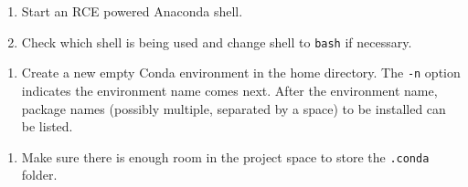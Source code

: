 \documentclass[]{book}
\newenvironment{Shaded}{\begin{snugshade}}{\end{snugshade}}
\newcommand{\DecValTok}[1]{\textcolor[rgb]{0.00,0.00,0.81}{#1}}
\newcommand{\StringTok}[1]{\textcolor[rgb]{0.31,0.60,0.02}{#1}}
\newcommand{\CommentTok}[1]{\textcolor[rgb]{0.56,0.35,0.01}{\textit{#1}}}
\newcommand{\OperatorTok}[1]{\textcolor[rgb]{0.81,0.36,0.00}{\textbf{#1}}}
\newcommand{\ErrorTok}[1]{\textcolor[rgb]{0.64,0.00,0.00}{\textbf{#1}}}
\newcommand{\NormalTok}[1]{#1}
\providecommand{\tightlist}{%
  \setlength{\itemsep}{0pt}\setlength{\parskip}{0pt}}
\begin{document}
\begin{enumerate}
\def\labelenumi{\arabic{enumi}.}
\tightlist
\item
  Start an RCE powered Anaconda shell.
\item
  Check which shell is being used and change shell to \texttt{bash} if
  necessary.
\end{enumerate}

\begin{Shaded}
\end{Shaded}

\begin{enumerate}
\def\labelenumi{\arabic{enumi}.}
\setcounter{enumi}{2}
\tightlist
\item
  Create a new empty Conda environment in the home directory. The
  \texttt{-n} option indicates the environment name comes next. After
  the environment name, package names (possibly multiple, separated by a
  space) to be installed can be listed.
\end{enumerate}

\begin{Shaded}
\end{Shaded}

\begin{enumerate}
\def\labelenumi{\arabic{enumi}.}
\setcounter{enumi}{3}
\tightlist
\item
  Make sure there is enough room in the project space to store the
  \texttt{.conda} folder.
\end{enumerate}

\begin{Shaded}
\end{Shaded}
\end{document}
